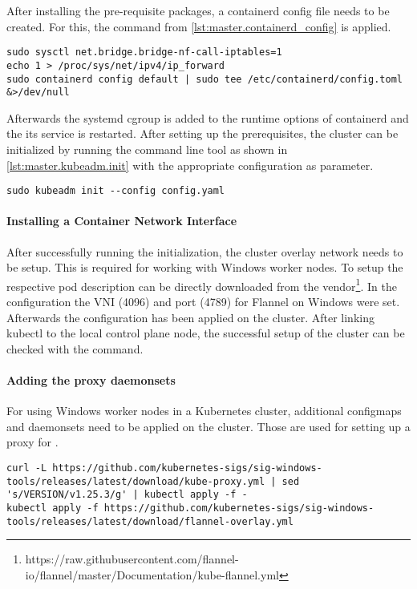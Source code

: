 After installing the pre-requisite packages, a containerd config file needs to be created. For this, the command from \autoref{lst:master.containerd_config} is applied.
\begin{lstlisting}[label=lst:master.containerd_config, caption={Bash command for setting up containerd config}]
sudo sysctl net.bridge.bridge-nf-call-iptables=1
echo 1 > /proc/sys/net/ipv4/ip_forward
sudo containerd config default | sudo tee /etc/containerd/config.toml &>/dev/null
\end{lstlisting}
Afterwards the systemd \ac{cgroup} is added to the runtime options of containerd and the its service is restarted.
After setting up the prerequisites, the cluster can be initialized by running the command line tool as shown in \autoref{lst:master.kubeadm.init} with the appropriate configuration as parameter.
\begin{lstlisting}[label=lst:master.kubeadm.init, caption={Bash command for setting up the cluster}]
sudo kubeadm init --config config.yaml
\end{lstlisting}

\paragraph{Installing a Container Network Interface}
After successfully running the initialization, the cluster overlay network  needs to be setup.
This is required for working with Windows worker nodes.  To setup  the respective pod description can be directly downloaded from the vendor\footnote{https://raw.githubusercontent.com/flannel-io/flannel/master/Documentation/kube-flannel.yml}. In the configuration the VNI (4096) and port (4789) for Flannel on Windows were set. Afterwards the configuration has been applied on the cluster.
After linking kubectl to the local control plane node, the successful setup of the cluster can be checked with the  command.


\paragraph{Adding the proxy daemonsets}
For using Windows worker nodes in a Kubernetes cluster, additional configmaps and daemonsets need to be applied on the cluster. Those are used for setting up a proxy for .
\begin{lstlisting}
curl -L https://github.com/kubernetes-sigs/sig-windows-tools/releases/latest/download/kube-proxy.yml | sed 's/VERSION/v1.25.3/g' | kubectl apply -f -
kubectl apply -f https://github.com/kubernetes-sigs/sig-windows-tools/releases/latest/download/flannel-overlay.yml
\end{lstlisting}

